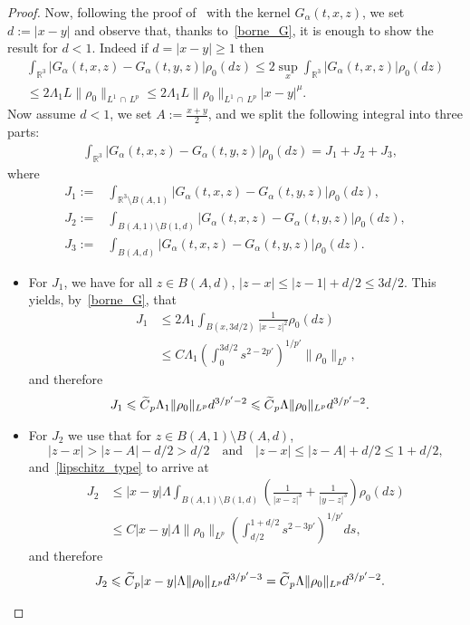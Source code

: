 \documentclass[10pt]{amsart}
\theoremstyle{definition}\newtheorem{defi}[theo]{Definition}\newtheorem{rema}[theo]{Remark}\newtheorem{exam}[theo]{Example}\newtheorem{exem}[theo]{Example}\newtheorem{nota}[theo]{Notation}
\newcommand{\R}{\mathbb{R}}
\renewcommand{\leq}{\leqslant}
\renewcommand{\geq}{\geqslant}
\let\oldtilde\tilde
\renewcommand*{\tilde}[1]{\mathchoice{\widetilde{#1}}{\widetilde{#1}}{\oldtilde{#1}}{\oldtilde{#1}}}
\begin{document}
\begin{proof}
Now, following the proof of~\cite[Lemma~2]{Miot} with the kernel $G_\alpha(t,x,z)$, we set $d:=|x-y|$ and observe that, thanks to~\eqref{borne_G}, it is enough to show the result for $d<1 $. Indeed if $d=|x-y|\geq 1$ then
\begin{multline}\label{eq:Holder_d>1}
\int_{\R^3} |G_\alpha(t,x,z)-G_\alpha(t,y,z)|\rho_0(dz)\leq 2 \underset{x}{\sup}\int_{\R^3} |G_\alpha(t,x,z)|\rho_0(dz) \\
\leq 2\Lambda_1 L \|\rho_0\|_{L^1\,\cap\,L^p} \leq 2\Lambda_1 L \|\rho_0\|_{L^1\,\cap\,L^p} |x-y|^\mu.
\end{multline}
Now assume $d<1$, we set $A:=\frac{x+y}{2}$, and we split the following integral into three parts:
\begin{align}\label{trich}
&\int_{\R^3} |G_\alpha(t,x,z)-G_\alpha(t,y,z)|\rho_0(dz) =J_1 +J_2+ J_3,
\end{align}
where
\begin{align*}
J_1 :=&\int_{\R^3\setminus B(A,1)}|G_\alpha(t,x,z)-G_\alpha(t,y,z)|\rho_0(dz),
\\ J_2 :=&\int_{B(A,1)\setminus B(1,d)}|G_\alpha(t,x,z)-G_\alpha(t,y,z)|\rho_0(dz),
\\ J_3 :=& \int_{B(A,d)}|G_\alpha(t,x,z)-G_\alpha(t,y,z)|\rho_0(dz).
\end{align*}
\begin{itemize}
\item For $J_1$, we have for all $z\in B(A,d)$, $|z-x|\leq |z-1|+d/2 \leq 3d/2$. This yields, by~\eqref{borne_G}, that
\begin{align*}
J_1&\leq 2 \Lambda_1 \int_{B(x,3d/2)} \frac{1}{|x-z|^2}\rho_0(dz)\\
&\leq C\Lambda_1 \left(\int_0^{3d/2} s^{2-2p'} \right)^{1/{p'}} \|\rho_0\|_{L^p},
\end{align*}
and therefore
\begin{align}\label{J1}
J_1 &\leq \tilde{C}_p \Lambda_1 \|\rho_0\|_{L^p} d^{3/{p'}-2}\leq \tilde{C}_p \Lambda \|\rho_0\|_{L^p} d^{3/{p'}-2}.
\end{align}
\item For $J_2$ we use that for $ z\in B(A,1)\setminus B(A,d)$,
\[
|z-x|>|z-A|-d/2>d/2
\quad\text{and}\quad |z-x|\leq |z-A|+d/2 \leq 1+d/2,
\]
and~\eqref{lipschitz_type} to arrive at
\begin{align*}
J_2&\leq |x-y|\Lambda \int_{ B(A,1)\setminus B(1,d)}\left(\frac{1 }{|x-z|^3}+\frac{1}{|y-z|^3} \right)\rho_0(dz)\\
&\leq C |x-y|\Lambda \|\rho_0\|_{L^p} \left(\int_{d/2}^{1+d/2} s^{2-3p'}\right)^{1/{p'}} ds,
\end{align*}
and therefore
\begin{align}\label{J2}
J_2&\leq \tilde{C}_p |x-y|\Lambda \|\rho_0\|_{L^p}d^{3/{p'}-3}=\tilde{C}_p \Lambda \|\rho_0\|_{L^p}d^{3/{p'}-2}.
\end{align}


\end{itemize}
\end{proof}
\end{document}
